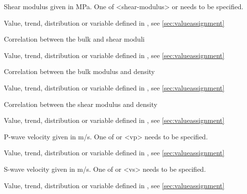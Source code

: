 {
 \slist
   \item \Description Shear modulus given in MPa. One of <shear-modulus> or  needs to be specified.
   \item \Argument Value, trend, distribution or variable defined in , see \autoref{sec:valueassignment}
   \item \Default 
 \elist

 \slist
   \item \Description Correlation between the bulk and shear moduli
   \item \Argument Value, trend, distribution or variable defined in , see \autoref{sec:valueassignment}
   \item {}
 \elist

 \slist
   \item \Description Correlation between the bulk modulus and density
   \item \Argument Value, trend, distribution or variable defined in , see \autoref{sec:valueassignment}
   \item {}
 \elist

 \slist
   \item \Description Correlation between the shear modulus and density
   \item \Argument Value, trend, distribution or variable defined in , see \autoref{sec:valueassignment}
   \item {}
 \elist

 \slist
   \item \Description P-wave velocity given in m/s. One of  or <vp> needs to be specified.
   \item \Argument Value, trend, distribution or variable defined in , see \autoref{sec:valueassignment}
   \item \Default 
 \elist

 \slist
   \item \Description S-wave velocity given in m/s. One of  or <vs> needs to be specified.
   \item \Argument Value, trend, distribution or variable defined in , see \autoref{sec:valueassignment}
   \item \Default 
 \elist

}
